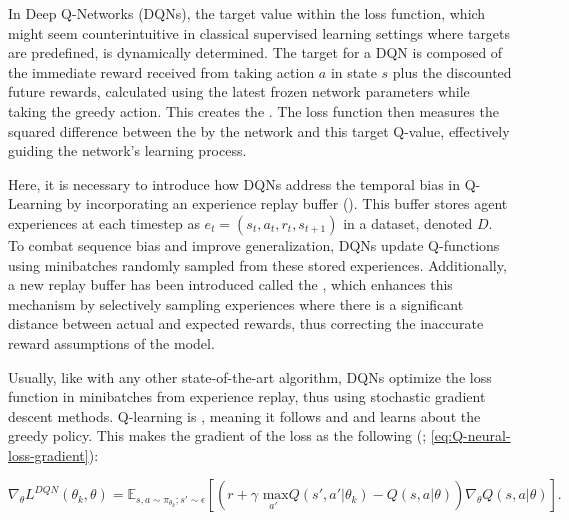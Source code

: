             
            \noindent In Deep Q-Networks (DQNs), the target value within the loss function, which might seem counterintuitive in classical supervised learning settings where targets are predefined, is dynamically determined. The target for a DQN is composed of the immediate reward received from taking action $a$ in state $s$ plus the discounted future rewards, calculated using the latest frozen network parameters while taking the greedy action. This creates the . The loss function then measures the squared difference between the  by the network and this target Q-value, effectively guiding the network's learning process.
            
            \bigskip
            
            \noindent Here, it is necessary to introduce how DQNs address the temporal bias in Q-Learning by incorporating an experience replay buffer (\textcolor{deepblue}{\cite{fedus2020revisiting}}). This buffer stores agent experiences at each timestep as $e_t = (s_t, a_t, r_t, s_{t+1})$ in a dataset, denoted $D$. To combat sequence bias and improve generalization, DQNs update Q-functions using minibatches randomly sampled from these stored experiences. Additionally, a new replay buffer has been introduced called the , which enhances this mechanism by selectively sampling experiences where there is a significant distance between actual and expected rewards, thus correcting the inaccurate reward assumptions of the model.
            
            \bigskip
            
            \noindent Usually, like with any other state-of-the-art algorithm, DQNs optimize the loss function in minibatches from experience replay, thus using stochastic gradient descent methods. Q-learning is , meaning it follows and  and learns about the greedy policy. This makes the gradient of the loss as the following (\textcolor{deepblue}{\cite{mnih2013playing}; \autoref{eq:Q-neural-loss-gradient}}):
            
            \begin{equation}
                \nabla_{\theta} L^{DQN}(\theta_k, \theta) = \mathbb{E}_{s, a \sim \pi_{\theta_k}; s' \sim \epsilon} \left [ \left ( r + \gamma\underset{a'}{\text{ max}}Q(s', a' | \theta_k) - Q(s, a | \theta) \right ) \nabla_\theta Q(s, a | \theta) \right].
                \label{eq:Q-neural-loss-gradient}
            \end{equation}
            
